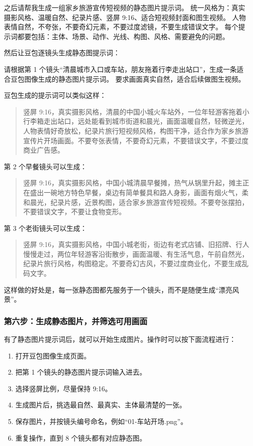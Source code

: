 \begin{tcolorbox}[promptbox]
之后请帮我生成一组家乡旅游宣传短视频的静态图片提示词。
统一风格为：真实摄影风格、温暖自然、纪录片感、竖屏 9:16、适合短视频封面和图生视频。
人物表情自然，不夸张，不要奇幻元素，不要过度滤镜，不要生成错误文字。
每个提示词都要包括：主体、场景、动作、光线、构图、风格、需要避免的问题。
\end{tcolorbox}

然后让豆包逐镜头生成静态图提示词：

\begin{tcolorbox}[promptbox]
请根据第 1 个镜头“清晨城市入口或车站，朋友拖着行李走出站口”，生成一条适合豆包图像生成的静态图片提示词。
要求画面真实自然，适合后续做图生视频。
\end{tcolorbox}

豆包生成的提示词可以类似这样：
\begin{quote}
竖屏 9:16，真实摄影风格，清晨的中国小城火车站外，一位年轻游客拖着小行李箱走出站口，远处能看到城市街道和晨光，画面温暖自然，轻微逆光，人物表情好奇放松，纪录片旅行短视频风格，构图干净，适合作为家乡旅游宣传片开场画面。不要夸张表情，不要奇幻元素，不要错误文字，不要过度商业广告感。
\end{quote}

第 2 个早餐镜头可以生成：
\begin{quote}
竖屏 9:16，真实摄影风格，中国小城清晨早餐摊，热气从锅里升起，摊主正在盛出一碗地方特色早餐，桌边有简单餐具和路人身影，画面有烟火气，柔和晨光，纪录片感，近景构图，适合家乡旅游宣传短视频。不要夸张摆拍，不要错误文字，不要让食物变形。
\end{quote}

第 3 个老街镜头可以生成：
\begin{quote}
竖屏 9:16，真实摄影风格，中国小城老街，街边有老式店铺、旧招牌、行人慢慢走过，两位年轻游客沿街散步，画面温暖、有生活气息，午前自然光，纪录片旅行风格，构图稳定。不要奇幻古风，不要过度商业化，不要生成乱码文字。
\end{quote}

这样做的好处是，每一张静态图都先服务于一个镜头，而不是随便生成“漂亮风景”。

\subsubsection*{第六步：生成静态图片，并筛选可用画面}

有了静态图片提示词后，就可以开始生成图片。操作时可以按下面流程进行：
\begin{enumerate}
    \item 打开豆包图像生成页面。
    \item 把第 1 个镜头的静态图片提示词输入进去。
    \item 选择竖屏比例，尽量保持 9:16。
    \item 生成图片后，挑选最自然、最真实、主体最清楚的一张。
    \item 保存图片，并按镜头编号命名，例如“01-车站开场.png”。
    \item 重复操作，直到 8 个镜头都有对应静态图。
\end{enumerate}

